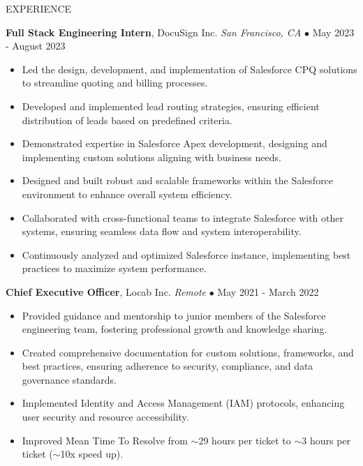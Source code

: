 \documentclass{resume} %
\begin{document}
\begin{rSection}{EXPERIENCE}

\textbf{Full Stack Engineering Intern}, DocuSign Inc. \hfill \textit{San Francisco, CA} $\bullet$ May 2023 - August 2023
\vspace{-2mm}
\begin{itemize}
\itemsep -6pt {}
\item Led the design, development, and implementation of Salesforce CPQ solutions to streamline quoting and billing processes.\n\item Developed and implemented lead routing strategies, ensuring efficient distribution of leads based on predefined criteria.\n\item Demonstrated expertise in Salesforce Apex development, designing and implementing custom solutions aligning with business needs.\n\item Designed and built robust and scalable frameworks within the Salesforce environment to enhance overall system efficiency.\n\item Collaborated with cross-functional teams to integrate Salesforce with other systems, ensuring seamless data flow and system interoperability.\n\item Continuously analyzed and optimized Salesforce instance, implementing best practices to maximize system performance.\end{itemize}

\vspace{-1mm}

\textbf{Chief Executive Officer}, Locab Inc. \hfill \textit{Remote} $\bullet$ May 2021 - March 2022
\vspace{-2mm}
\begin{itemize}
\itemsep -6pt {}
\item Provided guidance and mentorship to junior members of the Salesforce engineering team, fostering professional growth and knowledge sharing.\n\item Created comprehensive documentation for custom solutions, frameworks, and best practices, ensuring adherence to security, compliance, and data governance standards.\n\item Implemented Identity and Access Management (IAM) protocols, enhancing user security and resource accessibility.\n\item Improved Mean Time To Resolve from \(\sim \)29 hours per ticket to \(\sim \)3 hours per ticket (\(\sim \)10x speed up).\end{itemize}


\end{rSection}
\end{document}
